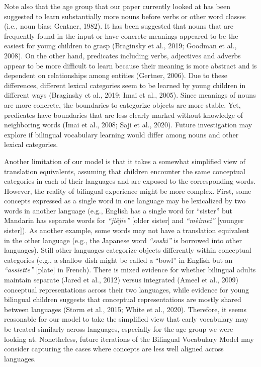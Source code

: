 \documentclass[
  english,
  ,man,floatsintext]{apa6}
\begin{document}
Note also that the age group that our paper currently looked at has been suggested to learn substantially more nouns before verbs or other word classes (i.e., noun bias; Gentner, 1982). It has been suggested that nouns that are frequently found in the input or have concrete meanings appeared to be the easiest for young children to grasp (Braginsky et al., 2019; Goodman et al., 2008). On the other hand, predicates including verbs, adjectives and adverbs appear to be more difficult to learn because their meaning is more abstract and is dependent on relationships among entities (Gertner, 2006). Due to these differences, different lexical categories seem to be learned by young children in different ways (Braginsky et al., 2019; Imai et al., 2005). Since meanings of nouns are more concrete, the boundaries to categorize objects are more stable. Yet, predicates have boundaries that are less clearly marked without knowledge of neighboring words (Imai et al., 2008; Saji et al., 2020). Future investigation may explore if bilingual vocabulary learning would differ among nouns and other lexical categories.

Another limitation of our model is that it takes a somewhat simplified view of translation equivalents, assuming that children encounter the same conceptual categories in each of their languages and are exposed to the corresponding words. However, the reality of bilingual experience might be more complex. First, some concepts expressed as a single word in one language may be lexicalized by two words in another language (e.g., English has a single word for ``sister'' but Mandarin has separate words for \emph{``jiějie''} {[}older sister{]} and \emph{``mèimei''} {[}younger sister{]}). As another example, some words may not have a translation equivalent in the other language (e.g., the Japanese word \emph{``sushi''} is borrowed into other languages). Still other languages categorize objects differently within conceptual categories (e.g., a shallow dish might be called a ``bowl'' in English but an \emph{``assiette''} {[}plate{]} in French). There is mixed evidence for whether bilingual adults maintain separate (Jared et al., 2012) versus integrated (Ameel et al., 2009) conceptual representations across their two languages, while evidence for young bilingual children suggests that conceptual representations are mostly shared between languages (Storm et al., 2015; White et al., 2020). Therefore, it seems reasonable for our model to take the simplified view that early vocabulary may be treated similarly across languages, especially for the age group we were looking at. Nonetheless, future iterations of the Bilingual Vocabulary Model may consider capturing the cases where concepts are less well aligned across languages.
\end{document}
